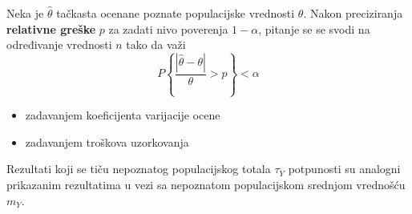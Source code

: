 \documentclass[10pt,a4paper,]{article}
\begin{document}
Neka je $\hat{\theta}$ tačkasta ocenane poznate populacijske vrednosti $\theta$.
Nakon preciziranja \textbf{relativne 
greške} $p$ za zadati nivo poverenja $1-\alpha$, 
pitanje se se svodi na određivanje vrednosti $n$ tako da 
važi
$$ P\left\{\frac{|\hat{\theta} - \theta|}{\theta} > p \right\} < \alpha$$
\begin{itemize}
\item zadavanjem koeficijenta varijacije ocene
\item zadavanjem troškova uzorkovanja
\end{itemize}

Rezultati koji se tiču nepoznatog populacijskog totala $\tau_Y$ potpunosti su 
analogni prikazanim rezultatima u vezi sa nepoznatom 
populacijskom srednjom vrednošću $m_Y$.
\end{document}
